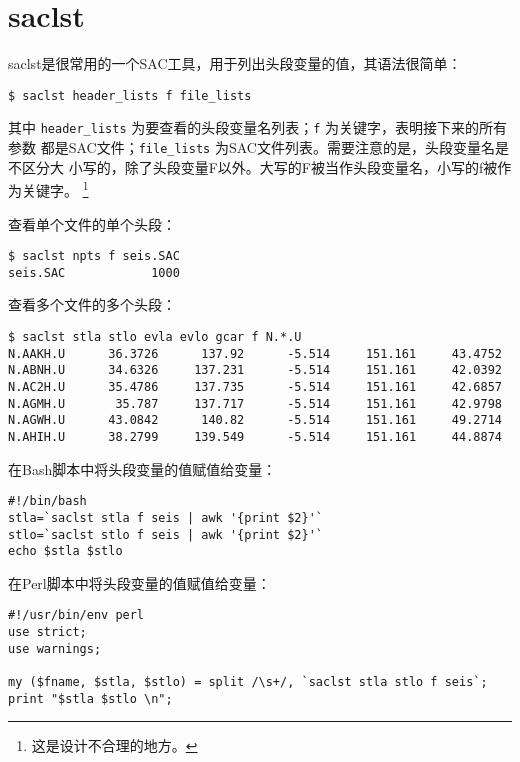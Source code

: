 \section{saclst}
\label{sec:saclst}

saclst是很常用的一个SAC工具，用于列出头段变量的值，其语法很简单：
\begin{verbatim}
$ saclst header_lists f file_lists
\end{verbatim}
其中 \verb|header_lists| 为要查看的头段变量名列表；\texttt{f} 为关键字，表明接下来的所有参数
都是SAC文件；\verb|file_lists| 为SAC文件列表。需要注意的是，头段变量名是不区分大
小写的，除了头段变量F以外。大写的F被当作头段变量名，小写的f被作为关键字。
\footnote{这是设计不合理的地方。}

查看单个文件的单个头段：
\begin{verbatim}
$ saclst npts f seis.SAC
seis.SAC            1000
\end{verbatim}

查看多个文件的多个头段：
\begin{verbatim}
$ saclst stla stlo evla evlo gcar f N.*.U
N.AAKH.U      36.3726      137.92      -5.514     151.161     43.4752
N.ABNH.U      34.6326     137.231      -5.514     151.161     42.0392
N.AC2H.U      35.4786     137.735      -5.514     151.161     42.6857
N.AGMH.U       35.787     137.717      -5.514     151.161     42.9798
N.AGWH.U      43.0842      140.82      -5.514     151.161     49.2714
N.AHIH.U      38.2799     139.549      -5.514     151.161     44.8874
\end{verbatim}

在Bash脚本中将头段变量的值赋值给变量：
\begin{verbatim}
#!/bin/bash
stla=`saclst stla f seis | awk '{print $2}'`
stlo=`saclst stlo f seis | awk '{print $2}'`
echo $stla $stlo
\end{verbatim}

在Perl脚本中将头段变量的值赋值给变量：
\begin{verbatim}
#!/usr/bin/env perl 
use strict;
use warnings;

my ($fname, $stla, $stlo) = split /\s+/, `saclst stla stlo f seis`;
print "$stla $stlo \n";
\end{verbatim}

